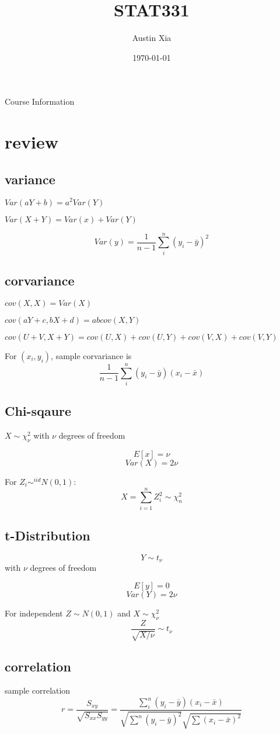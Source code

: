\documentclass[10pt]{article}
\theoremstyle{break}
\begin{document}
\let\ref\Cref

\title{\bf{STAT331 }}
\date{\today}
\author{Austin Xia}

\maketitle
\newpage
\tableofcontents
\listoffigures
\listoftables
\newpage
{Course Information}

\section{review}
\subsection{variance}
$Var(aY+b) = a^2Var(Y)$

$Var(X+Y) = Var(x)+Var(Y)$

$$Var(y)=\frac{1}{n-1}\sum_i^n(y_i-\bar{y})^2$$

\subsection{corvariance}
$cov(X, X) = Var(X)$

$cov(aY+c, bX+d) = abcov(X,Y)$

$cov(U+V, X+Y) = cov(U,X)+cov(U,Y)+cov(V,X)+cov(V,Y)$

For $(x_i, y_i)$, sample corvariance is 
$$\frac{1}{n-1}\sum_i^n(y_i-\bar{y})(x_i-\bar{x})$$

\subsection{Chi-sqaure}
$X\sim \chi^2_\nu $ with $\nu$ degrees of freedom

$$E[x]=\nu$$
$$Var(X)=2\nu$$ 

For $Z_i\sim^{iid}N(0,1):$
$$X=\sum^n_{i=1}Z_i^2\sim\chi^2_n$$

\subsection{t-Distribution}

$$Y\sim t_\nu$$ with $\nu$ degrees of freedom

$$E[y]=0$$
$$Var(Y)=2\nu$$

For independent $Z\sim N(0,1)$ and $X\sim\chi^2_\nu$
$$\frac{Z}{\sqrt{X/\nu}}\sim t_\nu$$

\subsection{correlation}
sample correlation 
$$r=\frac{S_{xy}}{\sqrt{S_{xx}S_{yy}}}=
\frac{\sum_i^n(y_i-\bar{y})(x_i-\bar{x})}{\sqrt{\sum^n(y_i-\bar{y})^2}\sqrt{\sum(x_i-\bar{x})^2}}$$
\end{document}
